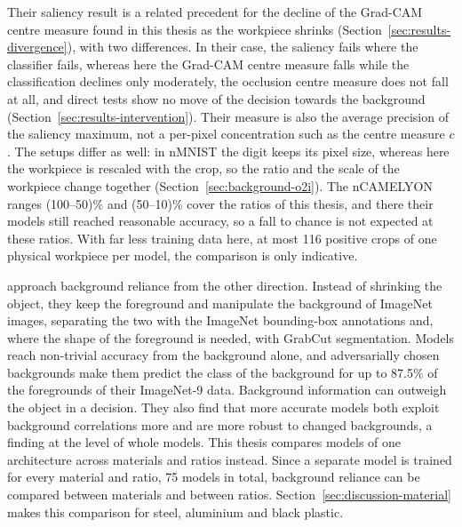 Their saliency result is a related precedent for the decline of the Grad-CAM centre
measure found in this thesis as the workpiece shrinks
(Section~\ref{sec:results-divergence}), with two differences. In their case, the
saliency fails where the classifier fails, whereas here the Grad-CAM centre measure
falls while the classification declines only moderately, the occlusion centre measure
does not fall at all, and direct tests show no move of the decision towards the
background (Section~\ref{sec:results-intervention}). Their measure is also the average precision of the
saliency maximum, not a per-pixel concentration such as the centre measure $c$. The
setups differ as well: in nMNIST the digit keeps its pixel size, whereas here the
workpiece is rescaled with the crop, so the ratio and the scale of the workpiece change
together (Section~\ref{sec:background-o2i}). The nCAMELYON ranges (100--50)\% and
(50--10)\% cover the ratios of this thesis, and there their models still reached
reasonable accuracy, so a fall to chance is not expected at these ratios. With far less
training data here, at most 116 positive crops of one physical workpiece per model, the
comparison is only indicative.

\citet{xiao2021noise} approach background reliance from the other direction.
Instead of shrinking the object, they keep the foreground and manipulate the background
of ImageNet \citep{deng2009imagenet} images, separating the two with the ImageNet
bounding-box annotations and, where the shape of the foreground is needed, with GrabCut
segmentation. Models reach non-trivial accuracy from the background alone, and adversarially chosen
backgrounds make them predict the class of the background for up to 87.5\% of the
foregrounds of their ImageNet-9 data. Background information can outweigh the object in a decision. They also
find that more accurate models both exploit background correlations more and are more
robust to changed backgrounds, a finding at the level of whole models. This thesis compares
models of one architecture across materials and ratios instead. Since a separate model is trained for every material and ratio, 75 models in
total, background reliance can be compared between materials and between ratios.
Section~\ref{sec:discussion-material} makes this comparison for steel, aluminium and
black plastic.

